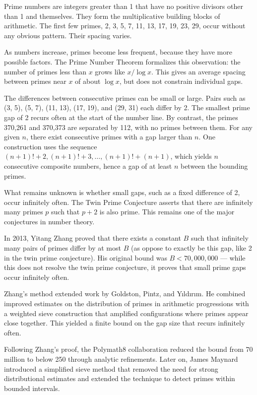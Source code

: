 Prime numbers are integers greater than 1 that have no positive divisors other than 1 and themselves. They form the multiplicative building blocks of arithmetic. The first few primes, 2, 3, 5, 7, 11, 13, 17, 19, 23, 29, occur without any obvious pattern. Their spacing varies.

As numbers increase, primes become less frequent, because they have more possible factors. The Prime Number Theorem formalizes this observation: the number of primes less than $x$ grows like $x / \log x$. This gives an average spacing between primes near $x$ of about $\log x$, but does not constrain individual gaps.

The differences between consecutive primes can be small or large. Pairs such as (3, 5), (5, 7), (11, 13), (17, 19), and (29, 31) each differ by 2. The smallest prime gap of 2 recurs often at the start of the number line. By contrast, the primes 370,261 and 370,373 are separated by 112, with no primes between them. For any given $n$, there exist consecutive primes with a gap larger than $n$. One construction uses the sequence $(n+1)! + 2,  (n+1)! + 3,  \dots,  (n+1)! + (n+1)$, which yields $n$ consecutive composite numbers, hence a gap of at least $n$ between the bounding primes.

What remains unknown is whether small gaps, such as a fixed difference of 2, occur infinitely often. The Twin Prime Conjecture asserts that there are infinitely many primes $p$ such that $p + 2$ is also prime. This remains one of the major conjectures in number theory.

In 2013, Yitang Zhang proved that there exists a constant $B$ such that infinitely many pairs of primes differ by at most $B$ (as oppose to exactly be this gap, like 2 in the twin prime conjecture). His original bound was $B < 70{,}000{,}000$ — while this does not resolve the twin prime conjecture, it proves that small prime gaps occur infinitely often.

Zhang's method extended work by Goldston, Pintz, and Yıldırım. He combined improved estimates on the distribution of primes in arithmetic progressions with a weighted sieve construction that amplified configurations where primes appear close together. This yielded a finite bound on the gap size that recurs infinitely often.

Following Zhang's proof, the Polymath8 collaboration reduced the bound from 70 million to below 250 through analytic refinements. Later on, James Maynard introduced a simplified sieve method that removed the need for strong distributional estimates and extended the technique to detect primes within bounded intervals.

